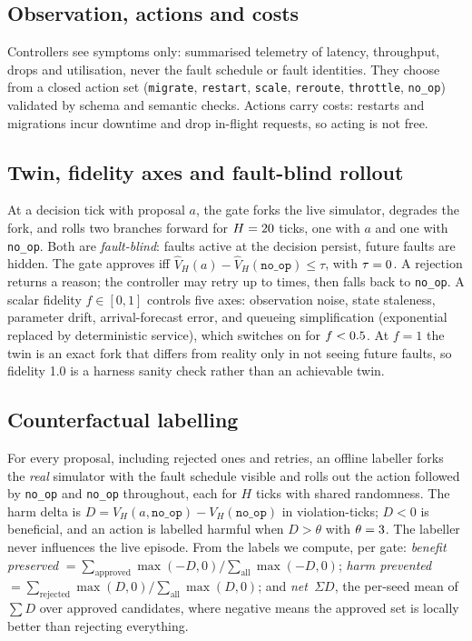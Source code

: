 \documentclass[conference]{IEEEtran}
\newcommand{\netSD}{net~$\Sigma D$}
\begin{document}
\subsection{Observation, actions and costs}
Controllers see symptoms only: summarised telemetry of latency, throughput, drops and utilisation, never the fault schedule or fault identities. They choose from a closed action set (\texttt{migrate}, \texttt{restart}, \texttt{scale}, \texttt{reroute}, \texttt{throttle}, \texttt{no\_op}) validated by schema and semantic checks. Actions carry costs: restarts and migrations incur downtime and drop in-flight requests, so acting is not free.

\subsection{Twin, fidelity axes and fault-blind rollout}
At a decision tick with proposal $a$, the gate forks the live simulator, degrades the fork, and rolls two branches forward for $H=20$ ticks, one with $a$ and one with \texttt{no\_op}. Both are \emph{fault-blind}: faults active at the decision persist, future faults are hidden. The gate approves iff $\hat V_H(a) - \hat V_H(\texttt{no\_op}) \le \tau$, with $\tau=0$. A rejection returns a reason; the controller may retry up to \RetryCap{} times, then falls back to \texttt{no\_op}. A scalar fidelity $f\in[0,1]$ controls five axes: observation noise, state staleness, parameter drift, arrival-forecast error, and queueing simplification (exponential replaced by deterministic service), which switches on for $f<0.5$. At $f=1$ the twin is an exact fork that differs from reality only in not seeing future faults, so fidelity 1.0 is a harness sanity check rather than an achievable twin.

\subsection{Counterfactual labelling}
For every proposal, including rejected ones and retries, an offline labeller forks the \emph{real} simulator with the fault schedule visible and rolls out the action followed by \texttt{no\_op} and \texttt{no\_op} throughout, each for $H$ ticks with shared randomness. The harm delta is $D = V_H(a,\texttt{no\_op}) - V_H(\texttt{no\_op})$ in violation-ticks; $D<0$ is beneficial, and an action is labelled harmful when $D>\theta$ with $\theta=3$. The labeller never influences the live episode. From the labels we compute, per gate: \emph{benefit preserved} $=\sum_{\text{approved}}\max(-D,0)/\sum_{\text{all}}\max(-D,0)$; \emph{harm prevented} $=\sum_{\text{rejected}}\max(D,0)/\sum_{\text{all}}\max(D,0)$; and \emph{\netSD{}}, the per-seed mean of $\sum D$ over approved candidates, where negative means the approved set is locally better than rejecting everything.
\end{document}
